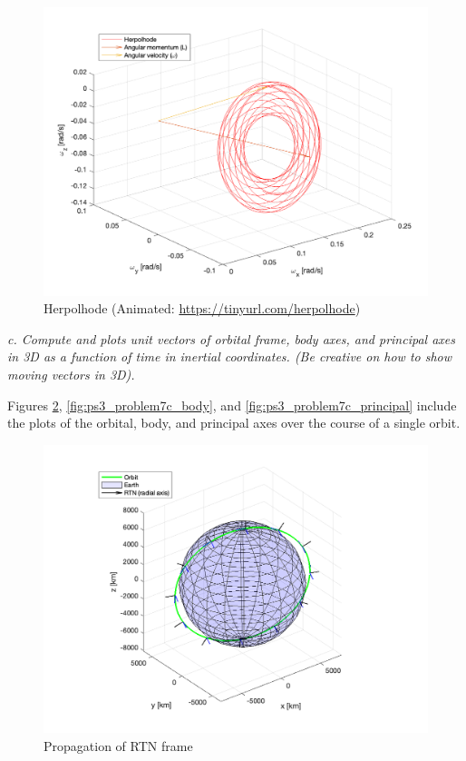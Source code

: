 \begin{figure}[H]
\centering
\includegraphics[scale=0.6]{Images/ps3_problem7b.png}
\caption{Herpolhode (Animated: \protect\url{https://tinyurl.com/herpolhode})}
\label{fig:ps3_problem7b}
\end{figure}

\textit{c. Compute and plots unit vectors of orbital frame, body axes, and principal axes in 3D as a function of time in inertial coordinates. (Be creative on how to show moving vectors in 3D).}

Figures \ref{fig:ps3_problem7c_rtn}, \ref{fig:ps3_problem7c_body}, and \ref{fig:ps3_problem7c_principal} include the plots of the orbital, body, and principal axes over the course of a single orbit.

\begin{figure}[H]
\centering
\includegraphics[scale=0.6]{Images/ps3_problem7c_rtn.png}
\caption{Propagation of RTN frame}
\label{fig:ps3_problem7c_rtn}
\end{figure}

